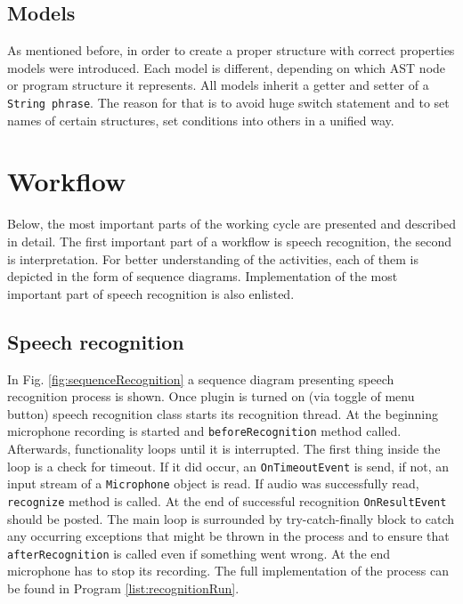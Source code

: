 \subsection{Models}
As mentioned before, in order to create a proper structure with correct properties models were introduced. Each model is different, depending on which AST node or program structure it represents. All models inherit a getter and setter of a \texttt{String phrase}. The reason for that is to avoid huge switch statement and to set names of certain structures, set conditions into others \etc in a unified way.

\section{Workflow}

Below, the most important parts of the working cycle are presented and described in detail. The first important part of a workflow is speech recognition, the second is interpretation. For better understanding of the activities, each of them is depicted in the form of sequence diagrams. Implementation of the most important part of speech recognition is also enlisted.

\subsection{Speech recognition}

In Fig. \ref{fig:sequenceRecognition} a sequence diagram presenting speech recognition process is shown. Once plugin is turned on (via toggle of menu button) speech recognition class starts its recognition thread. At the beginning microphone recording is started and \texttt{beforeRecognition} method called. Afterwards, functionality loops until it is interrupted. The first thing inside the loop is a check for timeout. If it did occur, an \texttt{OnTimeoutEvent} is send, if not, an input stream of a \texttt{Microphone} object is read. If audio was successfully read, \texttt{recognize} method is called. At the end of successful recognition \texttt{OnResultEvent} should be posted. The main loop is surrounded by try-catch-finally block to catch any occurring exceptions that might be thrown in the process and to ensure that \texttt{afterRecognition} is called even if something went wrong. At the end microphone has to stop its recording. The full implementation of the process can be found in Program \ref{list:recognitionRun}.

